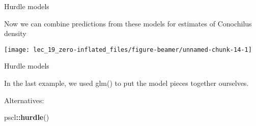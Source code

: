 \documentclass[ignorenonframetext,]{beamer}
\newenvironment{Shaded}{\begin{snugshade}}{\end{snugshade}}
\newcommand{\KeywordTok}[1]{\textcolor[rgb]{0.13,0.29,0.53}{\textbf{#1}}}
\newcommand{\DataTypeTok}[1]{\textcolor[rgb]{0.13,0.29,0.53}{#1}}
\newcommand{\DecValTok}[1]{\textcolor[rgb]{0.00,0.00,0.81}{#1}}
\newcommand{\StringTok}[1]{\textcolor[rgb]{0.31,0.60,0.02}{#1}}
\newcommand{\OperatorTok}[1]{\textcolor[rgb]{0.81,0.36,0.00}{\textbf{#1}}}
\newcommand{\NormalTok}[1]{#1}
\begin{document}
\begin{frame}[fragile]{Hurdle models}

Now we can combine predictions from these models for estimates of
Conochilus density

\begin{Shaded}
\end{Shaded}

\begin{center}\texttt{[image: lec\_19\_zero-inflated\_files/figure-beamer/unnamed-chunk-14-1]} \end{center}

\end{frame}

\begin{frame}[fragile]{Hurdle models}

In the last example, we used glm() to put the model pieces together
ourselves.

Alternatives:

\begin{Shaded}
\begin{Highlighting}[]
\NormalTok{pscl}\OperatorTok{::}\KeywordTok{hurdle}\NormalTok{()}
\end{Highlighting}
\end{Shaded}

\end{frame}
\end{document}
